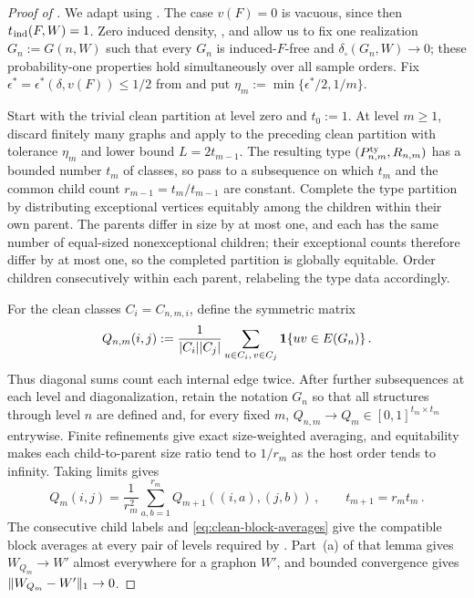 \begin{proof}[Proof of ]
We adapt \cite[proof of Lemma~5.1]{lovasz2006limits} using . The case $v(F)=0$ is vacuous, since then $t_{\hspace{0.2mm}\mathrm{ind}}(F,W)=1$. Zero induced density, \cite[Corollary~2.6]{lovasz2006limits}, and \cite[Theorem~3.8]{borgs2008convergent} allow us to fix one realization $G_n:=G(n,W)$ such that every $G_n$ is induced-$F$-free and $\delta_\square(G_n,W)\to0$; these probability-one properties hold simultaneously over all sample orders. Fix $\epsilon^\ast=\epsilon^\ast(\delta,v(F))\leq1/2$ from  and put $\eta_m:=\min\{\epsilon^\ast/2,1/m\}$.

Start with the trivial clean partition at level zero and $t_0:=1$. At level $m\geq1$, discard finitely many graphs and apply  to the preceding clean partition with tolerance $\eta_m$ and lower bound $L=2t_{m-1}$. The resulting type $(P^{\mathrm{ty}}_{n,m},R_{n,m})$ has a bounded number $t_m$ of classes, so pass to a subsequence on which $t_m$ and the common child count $r_{m-1}=t_m/t_{m-1}$ are constant. Complete the type partition by distributing exceptional vertices equitably among the children within their own parent. The parents differ in size by at most one, and each has the same number of equal-sized nonexceptional children; their exceptional counts therefore differ by at most one, so the completed partition is globally equitable. Order children consecutively within each parent, relabeling the type data accordingly.

For the clean classes $C_i=C_{n,m,i}$, define the symmetric matrix
$$Q_{n,m}(i,j):=\frac{1}{|C_i||C_j|}\sum_{u\in C_i,\,v\in C_j}\boldsymbol{1}\{uv\in E(G_n)\}\,.$$
Thus diagonal sums count each internal edge twice. After further subsequences at each level and diagonalization, retain the notation $G_n$ so that all structures through level $n$ are defined and, for every fixed $m$, $Q_{n,m}\to Q_m\in[0,1]^{t_m\times t_m}$ entrywise. Finite refinements give exact size-weighted averaging, and equitability makes each child-to-parent size ratio tend to $1/r_m$ as the host order tends to infinity. Taking limits gives
\begin{equation}\label{eq:clean-block-averages}
Q_m(i,j)=\frac{1}{r_m^2}\sum_{a,b=1}^{r_m}Q_{m+1}((i,a),(j,b))\,,\qquad t_{m+1}=r_mt_m\,.
\end{equation}
The consecutive child labels and \eqref{eq:clean-block-averages} give the compatible block averages at every pair of levels required by \cite[Lemma~5.2]{lovasz2006limits}. Part~(a) of that lemma gives $W_{Q_m}\to W'$ almost everywhere for a graphon $W'$, and bounded convergence gives $\lVert W_{Q_m}-W'\rVert_1\to0$.


\end{proof}

